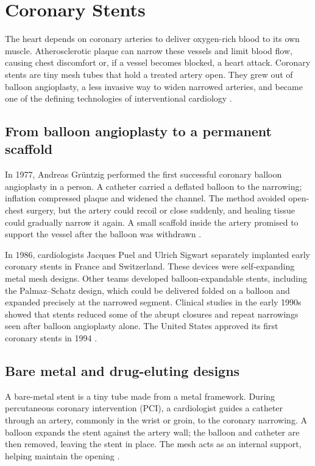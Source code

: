 \documentclass[12pt,oneside]{book}
\begin{document}
\chapter[Coronary Stents]{Coronary Stents}

The heart depends on coronary arteries to deliver oxygen-rich blood to its
own muscle. Atherosclerotic plaque can narrow these vessels and limit blood
flow, causing chest discomfort or, if a vessel becomes blocked, a heart
attack. Coronary stents are tiny mesh tubes that hold a treated artery open.
They grew out of balloon angioplasty, a less invasive way to widen narrowed
arteries, and became one of the defining technologies of interventional
cardiology \cite{coronaryPCIHistory,ahaCoronaryStent}.

\section{From balloon angioplasty to a permanent scaffold}
In 1977, Andreas Gr\"untzig performed the first successful coronary balloon
angioplasty in a person. A catheter carried a deflated balloon to the
narrowing; inflation compressed plaque and widened the channel. The method
avoided open-chest surgery, but the artery could recoil or close suddenly,
and healing tissue could gradually narrow it again. A small scaffold inside
the artery promised to support the vessel after the balloon was withdrawn
\cite{coronaryPCIHistory,coronaryStentInception}.

In 1986, cardiologists Jacques Puel and Ulrich Sigwart separately implanted
early coronary stents in France and Switzerland. These devices were
self-expanding metal mesh designs. Other teams developed balloon-expandable
stents, including the Palmaz--Schatz design, which could be delivered folded
on a balloon and expanded precisely at the narrowed segment. Clinical
studies in the early 1990s showed that stents reduced some of the abrupt
closures and repeat narrowings seen after balloon angioplasty alone. The
United States approved its first coronary stents in 1994
\cite{coronaryStentInception,coronaryPCIHistory}.

\section{Bare metal and drug-eluting designs}
A bare-metal stent is a tiny tube made from a metal framework. During
percutaneous coronary intervention (PCI), a cardiologist guides a catheter
through an artery, commonly in the wrist or groin, to the coronary
narrowing. A balloon expands the stent against the artery wall; the balloon
and catheter are then removed, leaving the stent in place. The mesh acts as
an internal support, helping maintain the opening \cite{ahaCoronaryStent}.
\end{document}

